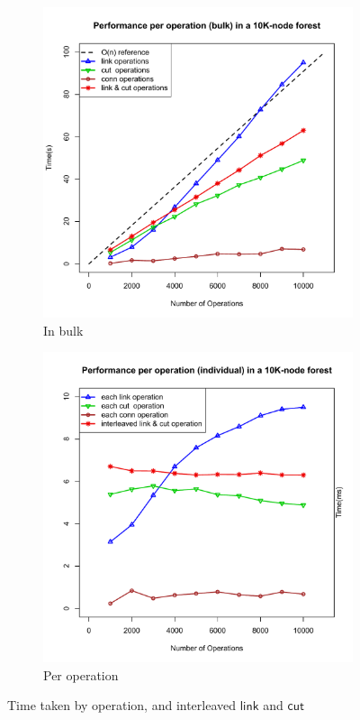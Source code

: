 \documentclass{elsarticle}
\newcommand{\MATHSF}[1]{\ensuremath{\mathsf{#1}}\xspace}
\newcommand{\link}{\MATHSF{link}}
\newcommand{\cut}{\MATHSF{cut}}
\begin{document}
\begin{figure}[H]
\centering
\begin{subfigure}{.5\textwidth}
  \centering
  \includegraphics[scale=0.38]{./Images/plotEach}
  \caption{In bulk}
\end{subfigure}%
\begin{subfigure}{.5\textwidth}
  \centering
  \includegraphics[scale=0.38]{./Images/plotOpsIndiv}
  \caption{Per operation}
\end{subfigure}
\caption{Time taken by operation, and interleaved \link and \cut}
\label{fig:EachOp}
\end{figure}
\end{document}
